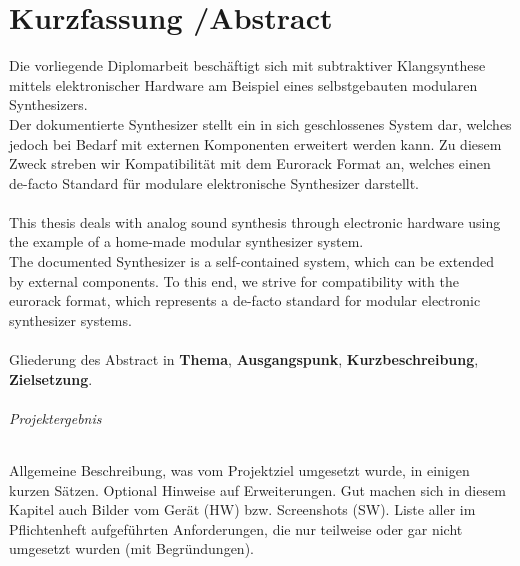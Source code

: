 \chapter*{Kurzfassung /Abstract }
\label{cha:abstract}

Die vorliegende Diplomarbeit beschäftigt sich mit subtraktiver Klangsynthese mittels elektronischer Hardware am Beispiel eines selbstgebauten modularen Synthesizers. \\

Der dokumentierte Synthesizer stellt ein in sich geschlossenes System dar, welches jedoch bei Bedarf mit externen Komponenten erweitert werden kann. Zu diesem Zweck streben wir Kompatibilität mit dem Eurorack Format an, welches einen de-facto Standard für modulare elektronische Synthesizer darstellt. \\ \\


This thesis deals with analog sound synthesis through electronic hardware using the example of a home-made modular synthesizer system. \\

The documented Synthesizer is a self-contained system, which can be extended by external components. To this end, we strive for compatibility with the eurorack format, which represents a de-facto standard for modular electronic synthesizer systems. \\ \\

Gliederung des Abstract in \textbf{Thema}, \textbf{Ausgangspunk}, \textbf{Kurzbeschreibung}, \textbf{Zielsetzung}.  

\subparagraph{Projektergebnis}

Allgemeine Beschreibung, was vom Projektziel umgesetzt wurde, in einigen kurzen Sätzen. Optional Hinweise auf Erweiterungen. Gut machen sich in diesem Kapitel auch Bilder vom Gerät (HW) bzw. Screenshots (SW).
Liste aller im Pflichtenheft aufgeführten Anforderungen, die nur teilweise oder gar nicht umgesetzt wurden (mit Begründungen).
